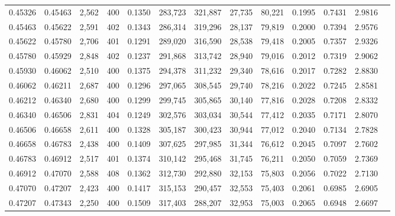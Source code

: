 \begin{tabular}{rrrrrrrrrrrrr}
0.45326 & 0.45463 & 2,562 & 400 &                                     0.1350 & 283,723 & 321,887 &  27,735 &  80,221 & 0.1995 & 0.7431 & 2.9816 \\
0.45463 & 0.45622 & 2,591 & 402 &                                     0.1343 & 286,314 & 319,296 &  28,137 &  79,819 & 0.2000 & 0.7394 & 2.9576 \\
0.45622 & 0.45780 & 2,706 & 401 &                                     0.1291 & 289,020 & 316,590 &  28,538 &  79,418 & 0.2005 & 0.7357 & 2.9326 \\
0.45780 & 0.45929 & 2,848 & 402 &                                     0.1237 & 291,868 & 313,742 &  28,940 &  79,016 & 0.2012 & 0.7319 & 2.9062 \\
0.45930 & 0.46062 & 2,510 & 400 &                                     0.1375 & 294,378 & 311,232 &  29,340 &  78,616 & 0.2017 & 0.7282 & 2.8830 \\
0.46062 & 0.46211 & 2,687 & 400 &                                     0.1296 & 297,065 & 308,545 &  29,740 &  78,216 & 0.2022 & 0.7245 & 2.8581 \\
0.46212 & 0.46340 & 2,680 & 400 &                                     0.1299 & 299,745 & 305,865 &  30,140 &  77,816 & 0.2028 & 0.7208 & 2.8332 \\
0.46340 & 0.46506 & 2,831 & 404 &                                     0.1249 & 302,576 & 303,034 &  30,544 &  77,412 & 0.2035 & 0.7171 & 2.8070 \\
0.46506 & 0.46658 & 2,611 & 400 &                                     0.1328 & 305,187 & 300,423 &  30,944 &  77,012 & 0.2040 & 0.7134 & 2.7828 \\
0.46658 & 0.46783 & 2,438 & 400 &                                     0.1409 & 307,625 & 297,985 &  31,344 &  76,612 & 0.2045 & 0.7097 & 2.7602 \\
0.46783 & 0.46912 & 2,517 & 401 &                                     0.1374 & 310,142 & 295,468 &  31,745 &  76,211 & 0.2050 & 0.7059 & 2.7369 \\
0.46912 & 0.47070 & 2,588 & 408 &                                     0.1362 & 312,730 & 292,880 &  32,153 &  75,803 & 0.2056 & 0.7022 & 2.7130 \\
0.47070 & 0.47207 & 2,423 & 400 &                                     0.1417 & 315,153 & 290,457 &  32,553 &  75,403 & 0.2061 & 0.6985 & 2.6905 \\
0.47207 & 0.47343 & 2,250 & 400 &                                     0.1509 & 317,403 & 288,207 &  32,953 &  75,003 & 0.2065 & 0.6948 & 2.6697 \\

\end{tabular}
